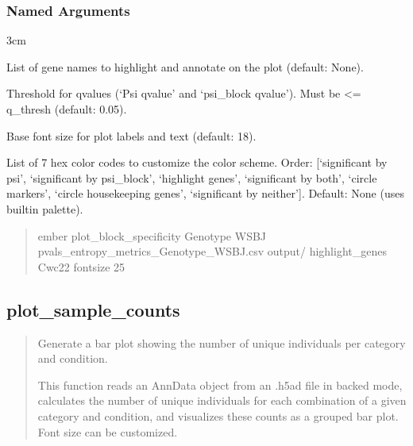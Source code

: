 \documentclass[letterpaper,10pt,english]{sphinxmanual}
\begin{document}
\subsubsection{Named Arguments}
\label{\detokenize{cli:named-arguments_repeat2}}\begin{optionlist}{3cm}
\item [\sphinxhyphen{}\sphinxhyphen{}highlight\_genes]  
\sphinxAtStartPar
List of gene names to highlight and annotate on the plot (default: None).
\item [\sphinxhyphen{}\sphinxhyphen{}q\_thresh]  
\sphinxAtStartPar
Threshold for q\sphinxhyphen{}values (‘Psi q\sphinxhyphen{}value’ and ‘psi\_block q\sphinxhyphen{}value’). Must be \textless{}= q\_thresh (default: 0.05).
\item [\sphinxhyphen{}\sphinxhyphen{}fontsize]  
\sphinxAtStartPar
Base font size for plot labels and text (default: 18).
\item [\sphinxhyphen{}\sphinxhyphen{}custom\_palette]  
\sphinxAtStartPar
List of 7 hex color codes to customize the color scheme. Order:
{[}‘significant by psi’, ‘significant by psi\_block’, ‘highlight genes’, ‘significant by both’, ‘circle markers’, ‘circle housekeeping genes’, ‘significant by neither’{]}. Default: None (uses built\sphinxhyphen{}in palette).
\end{optionlist}
\begin{quote}
\begin{description}
\sphinxAtStartPar
ember plot\_block\_specificity Genotype WSBJ pvals\_entropy\_metrics\_Genotype\_WSBJ.csv output/ \textendash{}highlight\_genes Cwc22 \textendash{}fontsize 25

\end{description}
\end{quote}


\subsection{plot\_sample\_counts}
\label{\detokenize{cli:plot_sample_counts}}\begin{quote}

\sphinxAtStartPar
Generate a bar plot showing the number of unique individuals per category and condition.

\sphinxAtStartPar
This function reads an AnnData object from an .h5ad file in backed mode,
calculates the number of unique individuals for each combination of a given
category and condition, and visualizes these counts as a grouped bar plot.
Font size can be customized.
\end{quote}
\end{document}
